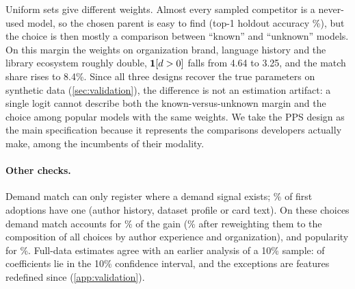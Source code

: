 Uniform sets give different weights. Almost every sampled competitor is a never-used model, so the chosen parent is
easy to find (top-1 holdout accuracy \topOneUnif\%), but the choice is then mostly a comparison between ``known'' and
``unknown'' models. On this margin the weights on organization brand, language history and the library ecosystem
roughly double, $\mathbf{1}[d>0]$ falls from 4.64 to 3.25, and the match share rises to 8.4\%. Since all three designs
recover the true parameters on synthetic data (\cref{sec:validation}), the difference is not an estimation
artifact: a single logit cannot describe both the known-versus-unknown margin and the choice among popular models
with the same weights. We take the PPS design as the main specification because it represents the comparisons
developers actually make, among the incumbents of their modality.

\paragraph{Other checks.}
Demand match can only register where a demand signal exists; \sigShare\% of first adoptions have one (author
history, dataset profile or card text). On these choices demand match accounts for \sigMatch\% of the gain
(\sigMatchRw\% after reweighting them to the composition of all choices by author experience and organization), and
popularity for \sigPop\%. Full-data estimates agree with an earlier analysis of a 10\% sample: \valIn{} of \valN{}
coefficients lie in the 10\% confidence interval, and the exceptions are features redefined since
(\cref{app:validation}).
